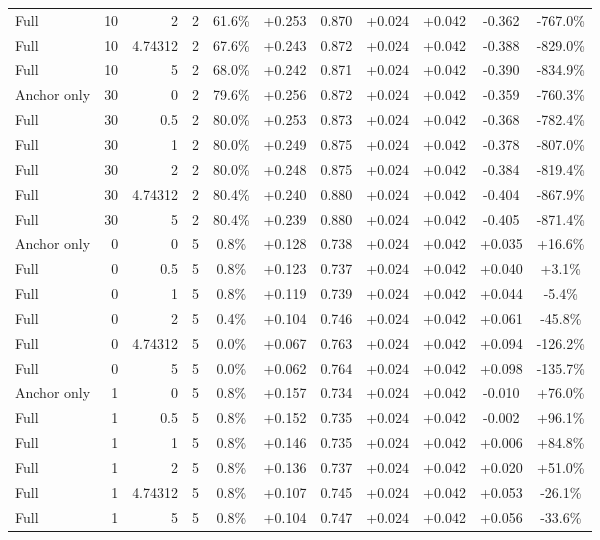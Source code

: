 \begin{table}[htbp]
\begin{tabular}{lrrrccccccc}
Full & 10 & 2 & 2 & 61.6\% & +0.253 & 0.870 & +0.024 & +0.042 & -0.362 & -767.0\% \\
Full & 10 & 4.74312 & 2 & 67.6\% & +0.243 & 0.872 & +0.024 & +0.042 & -0.388 & -829.0\% \\
Full & 10 & 5 & 2 & 68.0\% & +0.242 & 0.871 & +0.024 & +0.042 & -0.390 & -834.9\% \\
Anchor only & 30 & 0 & 2 & 79.6\% & +0.256 & 0.872 & +0.024 & +0.042 & -0.359 & -760.3\% \\
Full & 30 & 0.5 & 2 & 80.0\% & +0.253 & 0.873 & +0.024 & +0.042 & -0.368 & -782.4\% \\
Full & 30 & 1 & 2 & 80.0\% & +0.249 & 0.875 & +0.024 & +0.042 & -0.378 & -807.0\% \\
Full & 30 & 2 & 2 & 80.0\% & +0.248 & 0.875 & +0.024 & +0.042 & -0.384 & -819.4\% \\
Full & 30 & 4.74312 & 2 & 80.4\% & +0.240 & 0.880 & +0.024 & +0.042 & -0.404 & -867.9\% \\
Full & 30 & 5 & 2 & 80.4\% & +0.239 & 0.880 & +0.024 & +0.042 & -0.405 & -871.4\% \\
Anchor only & 0 & 0 & 5 & 0.8\% & +0.128 & 0.738 & +0.024 & +0.042 & +0.035 & +16.6\% \\
Full & 0 & 0.5 & 5 & 0.8\% & +0.123 & 0.737 & +0.024 & +0.042 & +0.040 & +3.1\% \\
Full & 0 & 1 & 5 & 0.8\% & +0.119 & 0.739 & +0.024 & +0.042 & +0.044 & -5.4\% \\
Full & 0 & 2 & 5 & 0.4\% & +0.104 & 0.746 & +0.024 & +0.042 & +0.061 & -45.8\% \\
Full & 0 & 4.74312 & 5 & 0.0\% & +0.067 & 0.763 & +0.024 & +0.042 & +0.094 & -126.2\% \\
Full & 0 & 5 & 5 & 0.0\% & +0.062 & 0.764 & +0.024 & +0.042 & +0.098 & -135.7\% \\
Anchor only & 1 & 0 & 5 & 0.8\% & +0.157 & 0.734 & +0.024 & +0.042 & -0.010 & +76.0\% \\
Full & 1 & 0.5 & 5 & 0.8\% & +0.152 & 0.735 & +0.024 & +0.042 & -0.002 & +96.1\% \\
Full & 1 & 1 & 5 & 0.8\% & +0.146 & 0.735 & +0.024 & +0.042 & +0.006 & +84.8\% \\
Full & 1 & 2 & 5 & 0.8\% & +0.136 & 0.737 & +0.024 & +0.042 & +0.020 & +51.0\% \\
Full & 1 & 4.74312 & 5 & 0.8\% & +0.107 & 0.745 & +0.024 & +0.042 & +0.053 & -26.1\% \\
Full & 1 & 5 & 5 & 0.8\% & +0.104 & 0.747 & +0.024 & +0.042 & +0.056 & -33.6\% \\

\end{tabular}
\end{table}
